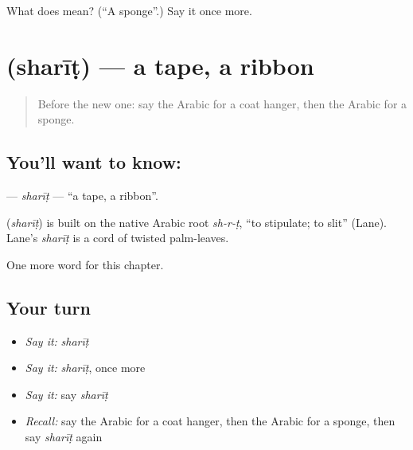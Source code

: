 \begin{tcolorbox}[breakable,colback=teal!4,colframe=teal!35!black,title={Before you move on}]
What does  mean? (\textquotedblleft{}A sponge\textquotedblright{}.) Say it once more.
\end{tcolorbox}
\section[\texorpdfstring{\ar{شريط} (sharīṭ)}{شريط (sharīṭ)}]{ (sharīṭ) — a tape, a ribbon}

\label{lesson:AR-C279-sharit}



\begin{quote}
Before the new one: say the Arabic for a coat hanger, then the Arabic for a sponge.
\end{quote}

\subsection*{You'll want to know: }
\textbf{} — \emph{sharīṭ} — \textquotedblleft{}a tape, a ribbon\textquotedblright{}.

\begin{cousinweb}
\textbf{} (\emph{sharīṭ}) is built on the native Arabic root \emph{sh-r-ṭ}, \textquotedblleft{}to stipulate; to slit\textquotedblright{} (Lane). Lane's \emph{sharīṭ} is a cord of twisted palm-leaves.
\end{cousinweb}

\begin{grammarlens}[title={What you've built}]
One more word for this chapter.
\end{grammarlens}

\subsection*{Your turn}
\begin{itemize}
\raggedright
  \item \emph{Say it:} \emph{sharīṭ}
  \item \emph{Say it:} \emph{sharīṭ}, once more
  \item \emph{Say it:} say \emph{sharīṭ}
  \item \emph{Recall:} say the Arabic for a coat hanger, then the Arabic for a sponge, then say \emph{sharīṭ} again
\end{itemize}

